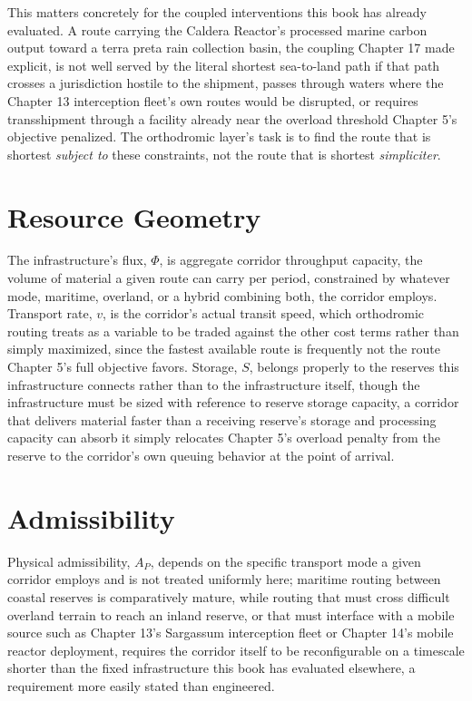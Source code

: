 \documentclass[11pt,oneside]{book}
\begin{document}
This matters concretely for the coupled interventions this book has already evaluated. A route carrying the Caldera Reactor's processed marine carbon output toward a terra preta rain collection basin, the coupling Chapter 17 made explicit, is not well served by the literal shortest sea-to-land path if that path crosses a jurisdiction hostile to the shipment, passes through waters where the Chapter 13 interception fleet's own routes would be disrupted, or requires transshipment through a facility already near the overload threshold Chapter 5's objective penalized. The orthodromic layer's task is to find the route that is shortest \emph{subject to} these constraints, not the route that is shortest \emph{simpliciter}.

\section*{Resource Geometry}

The infrastructure's flux, $\Phi$, is aggregate corridor throughput capacity, the volume of material a given route can carry per period, constrained by whatever mode, maritime, overland, or a hybrid combining both, the corridor employs. Transport rate, $v$, is the corridor's actual transit speed, which orthodromic routing treats as a variable to be traded against the other cost terms rather than simply maximized, since the fastest available route is frequently not the route Chapter 5's full objective favors. Storage, $S$, belongs properly to the reserves this infrastructure connects rather than to the infrastructure itself, though the infrastructure must be sized with reference to reserve storage capacity, a corridor that delivers material faster than a receiving reserve's storage and processing capacity can absorb it simply relocates Chapter 5's overload penalty from the reserve to the corridor's own queuing behavior at the point of arrival.

\section*{Admissibility}

Physical admissibility, $A_P$, depends on the specific transport mode a given corridor employs and is not treated uniformly here; maritime routing between coastal reserves is comparatively mature, while routing that must cross difficult overland terrain to reach an inland reserve, or that must interface with a mobile source such as Chapter 13's Sargassum interception fleet or Chapter 14's mobile reactor deployment, requires the corridor itself to be reconfigurable on a timescale shorter than the fixed infrastructure this book has evaluated elsewhere, a requirement more easily stated than engineered.
\end{document}
